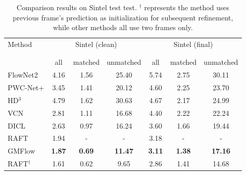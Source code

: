 \documentclass[10pt,twocolumn,letterpaper]{article}
\begin{document}
\begin{table}[t]
\footnotesize
    \centering
    \setlength{\tabcolsep}{2pt} %
    \begin{tabular}{lcccccc}
    \toprule
    \multirow{2}{*}[-2pt]{Method } & \multicolumn{3}{c}{Sintel (clean)} &
    \multicolumn{3}{c}{Sintel (final)} \\
    \addlinespace[-12pt]  \\
    \cmidrule(lr){2-4} \cmidrule(lr){5-7} 
    \addlinespace[-12pt] \\
    & all & matched & unmatched & all & matched & unmatched \\
    \midrule
    
    FlowNet2 \cite{ilg2017flownet} & 4.16 & 1.56 & 25.40 & 5.74 & 2.75 & 30.11 \\
    PWC-Net+ \cite{sun2019models} & 3.45 & 1.41 & 20.12 & 4.60 & 2.25 & 23.70  \\
    HD$^3$ \cite{yin2019hierarchical} & 4.79 & 1.62 & 30.63 & 4.67 & 2.17 & 24.99 \\
    VCN \cite{yang2019volumetric} & 2.81 & 1.11 & 16.68 & 4.40 & 2.22 & 22.24 \\
    DICL \cite{wang2020displacement} & 2.63 & 0.97 & 16.24 & 3.60 & 1.66 & 19.44 \\
    
    RAFT \cite{teed2020raft} & 1.94 & - & - & 3.18 & - & - \\
    GMFlow & \textbf{1.87} & \textbf{0.69} & \textbf{11.47} & \textbf{3.11} & \textbf{1.38} & \textbf{17.16} \\
    
    \midrule
    
    RAFT$^\dagger$ \cite{teed2020raft} & 1.61 & 0.62 & 9.65 & 2.86 & 1.41 & 14.68 \\
    

    \bottomrule
    \end{tabular}
    \vspace{-8pt}
    \caption{Comparison results on Sintel test test. $^\dagger$ represents the method uses previous frame's prediction as initialization for subsequent refinement, while other methods all use two frames only.}
    \vspace{-22pt}
    \label{tab:sintel_compare}
\end{table}





    
    
    
    
    
\end{document}
